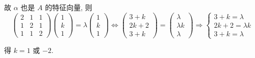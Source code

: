         故 \( \alpha \) 也是 \( A \) 的特征向量, 则
         \[ \begin{pmatrix}
                 2 & 1 & 1 \\
                 1 & 2 & 1 \\
                 1 & 1 & 2
             \end{pmatrix}\begin{pmatrix}
                 1 \\
                 k \\
                 1
             \end{pmatrix} = \lambda\begin{pmatrix}
                 1 \\
                 k \\
                 1
             \end{pmatrix} \Leftrightarrow \begin{pmatrix}
                 3 + k  \\
                 2k + 2 \\
                 3 + k
             \end{pmatrix} = \begin{pmatrix}
                 \lambda   \\
                 \lambda k \\
                 \lambda
             \end{pmatrix} \Rightarrow \begin{cases}
                 3 + k = \lambda    \\
                 2k + 2 = \lambda k \\
                 3 + k = \lambda
             \end{cases} \]

         得 \( k = 1 \) 或 \( -2 \).


